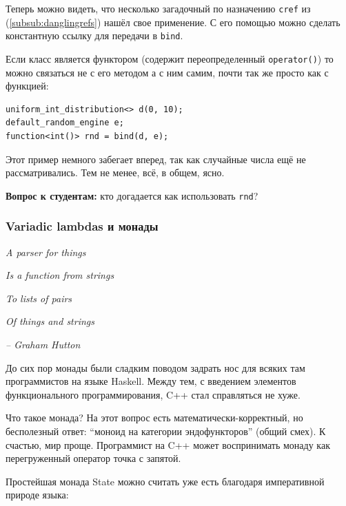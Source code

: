 \documentclass[a4paper,12pt,oneside]{article}
\newif\ifanswers
\begin{document}
\ifanswers
Первый аргумент \lstinline!f1! привязан к \lstinline!n2!, второй к \lstinline!n1!, третий 42, четвертый \lstinline!n! по ссылке, то есть 10, пятый \lstinline!n! по значению то есть 7, а аргумент 1001 не использован вообще.
\fi

Теперь можно видеть, что несколько загадочный по назначению \lstinline!cref! из (\ref{subsub:danglingrefs}) нашёл свое применение. С его помощью можно сделать константную ссылку для передачи в \lstinline!bind!.

Если класс является функтором (содержит переопределенный \lstinline!operator()!) то можно связаться не с его методом а с ним самим, почти так же просто как с функцией:

\begin{lstlisting}
uniform_int_distribution<> d(0, 10);
default_random_engine e;
function<int()> rnd = bind(d, e);
\end{lstlisting}

Этот пример немного забегает вперед, так как случайные числа ещё не рассматривались. Тем не менее, всё, в общем, ясно.

\textbf{Вопрос к студентам:} кто догадается как использовать \lstinline!rnd!?

\ifanswers
Правильный ответ: просто вызвать.
\fi

\subsubsection{Variadic lambdas и монады}\label{Monads}

\hfill\textit{A parser for things}

\hfill\textit{Is a function from strings}

\hfill\textit{To lists of pairs}

\hfill\textit{Of things and strings}{\vspace{0.5em}}

\hfill\textit{-- Graham Hutton}

До сих пор монады были сладким поводом задрать нос для всяких там программистов на языке Haskell. Между тем, с введением элементов функционального программирования, C++ стал справляться не хуже.

Что такое монада? На этот вопрос есть математически-корректный, но бесполезный ответ: ``моноид на категории эндофункторов'' (общий смех). К счастью, мир проще. Программист на C++ может воспринимать монаду как перегруженный оператор точка с запятой.

Простейшая монада State можно считать уже есть благодаря императивной природе языка:
\end{document}
